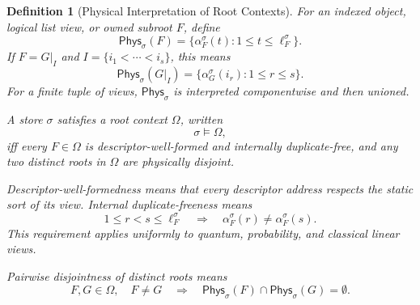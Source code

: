 \documentclass[acmsmall,screen,review,anonymous,nonacm]{acmart}
\newtheorem{definition}{Definition}[section]
\theoremstyle{defn_style}
\begin{document}
\begin{definition}[Physical Interpretation of Root Contexts]
For an indexed object, logical list view, or owned subroot \(F\), define
\[
\mathsf{Phys}_{\sigma}(F)
=
\{\alpha_F^\sigma(t):1\le t\le \ell_F^\sigma\}.
\]
If \(F=G|_I\) and \(I=\{i_1<\cdots<i_s\}\), this means
\[
\mathsf{Phys}_{\sigma}(G|_I)
=
\{\alpha_G^\sigma(i_r):1\le r\le s\}.
\]
For a finite tuple of views, \(\mathsf{Phys}_{\sigma}\) is interpreted
componentwise and then unioned.

A store \(\sigma\) satisfies a root context \(\Omega\), written
\[
\sigma\models\Omega,
\]
iff every \(F\in\Omega\) is descriptor-well-formed and internally duplicate-free,
and any two distinct roots in \(\Omega\) are physically disjoint.

Descriptor-well-formedness means that every descriptor address respects the
static sort of its view. Internal duplicate-freeness means
\[
1\le r<s\le \ell_F^\sigma
\quad\Longrightarrow\quad
\alpha_F^\sigma(r)\ne\alpha_F^\sigma(s).
\]
This requirement applies uniformly to quantum, probability, and classical
linear views.

Pairwise disjointness of distinct roots means
\[
F,G\in\Omega,\quad F\ne G
\quad\Longrightarrow\quad
\mathsf{Phys}_{\sigma}(F)\cap\mathsf{Phys}_{\sigma}(G)=\emptyset.
\]
\end{definition}
\end{document}
